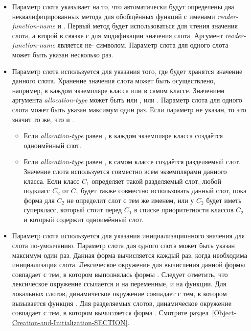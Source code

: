 \begin{defmac}
\begin{itemize}
\item 
Параметр слота  указывает на то, что автоматически будут определены
два неквалифицированных метода для обобщённых функций с именами
\emph{reader-function-name} и . Первый метод
будет использоваться для чтения значения слота, а второй в связке с 
для модификации значения слота.
Аргумент \emph{reader-function-name} является не- символом. Параметр
слота  для одного слота может быть указан несколько раз.

\item 
Параметр слота  используется для указания того, где будет
хранятся значение данного слота. Хранение значения слота может быть осуществлено,
например, в каждом экземпляре класса или в самом классе. Значением аргумента
\emph{allocation-type} может быть или , или . Параметр
слота  для одного слота может быть указан максимум один
раз. Если параметр  не указан, то это значит то же, что и
.

\begin{itemize}

\item 
Если \emph{allocation-type} равен , в каждом экземпляре класса
создаётся одноимённый слот.

\item 
Если \emph{allocation-type} равен , в самом классе создаётся
разделяемый слот. Значение слота используется совместно всем экземплярами
данного класса. Если класс $C_1$ определяет такой разделяемый слот, любой
подкласс $C_2$ от $C_1$ будет также совместно использовать данный слот, пока
форма  для $C_2$ не определит слот с тем же именем, или у $C_2$
будет иметь суперкласс, который стоит перед $C_1$ в списке приоритетности
классов $C_2$ и который содержит одноимённый слот.
\end{itemize}

\item
Параметр слота  используется для указания
инициализационного значения для слота по-умолчанию. Параметр слота
 для одного слота может быть указан максимум один раз. Данная
форма вычисляется каждый раз, когда необходима инициализация слота.  Лексическое
окружение для вычисления данной формы совпадает с тем, в котором выполнялась
формы . Следует отметить, что лексическое окружение ссылается и на
переменные, и на функции. Для локальных слотов, динамическое окружение совпадает
с тем, в котором вызывается функция . Для разделяемых слотов,
динамическое окружение совпадает с тем, в котором вычисляется форма
. Смотрите
раздел~\ref{Object-Creation-and-Initialization-SECTION}.


\end{itemize}
\end{defmac}
